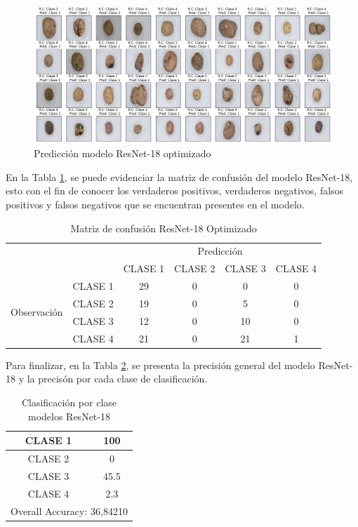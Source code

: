\begin{figure}[ht]
	\centering
	\includegraphics[scale=0.4]{Figs/514.png}
	\caption{Predicción modelo ResNet-18 optimizado}
	\label{fig:pre_res_opt}
\end{figure}

En la Tabla \ref{tab:MC_resnet_OPT}, se puede evidenciar la matriz de confusión del modelo ResNet-18, esto con el fin de conocer los verdaderos positivos, verdaderos negativos, falsos positivos y falsos negativos que se encuentran presentes en el modelo.

\begin{table}[htbp]
	\centering
	\begin{tabular}{|c|l|c|c|c|c|}
		\hline
		\multicolumn{2}{|c|}{\multirow{2}[4]{*}{}} & \multicolumn{4}{c|}{Predicción} \bigstrut\\
		\cline{3-6}    \multicolumn{2}{|c|}{} & CLASE 1 & CLASE 2 & CLASE 3 & CLASE 4 \bigstrut\\
		\hline
		\multirow{4}[8]{*}{\begin{sideways}Observación\end{sideways}} & CLASE 1 & 29     & 0     & 0    & 0 \bigstrut\\
		\cline{2-6}          & CLASE 2 & 19     & 0     & 5    & 0 \bigstrut\\
		\cline{2-6}          & CLASE 3 & 12     & 0     & 10    & 0 \bigstrut\\
		\cline{2-6}          & CLASE 4 & 21     & 0     & 21    & 1 \bigstrut\\
		\hline
	\end{tabular}%
	\caption{Matriz de confusión ResNet-18 Optimizado }
	\label{tab:MC_resnet_OPT}%
\end{table}%
Para finalizar, en la Tabla \ref{tab:resnetoptclases}, se presenta la precisión general del modelo ResNet-18 y la precisón por cada clase de clasificación.
\begin{table}[htbp]
	\centering
	\begin{tabular}{|c|c|}
		\hline
		CLASE 1 & 100 \bigstrut\\
		\hline
		CLASE 2 & 0 \bigstrut\\
		\hline
		CLASE 3 & 45.5 \bigstrut\\
		\hline
		CLASE 4 & 2.3 \bigstrut\\
		\hline
		\multicolumn{2}{|c|}{Overall Accuracy: 36,84210} \bigstrut\\
		\hline
	\end{tabular}%
	\caption{Clasificación por clase modelos ResNet-18}
	\label{tab:resnetoptclases}%
\end{table}%


